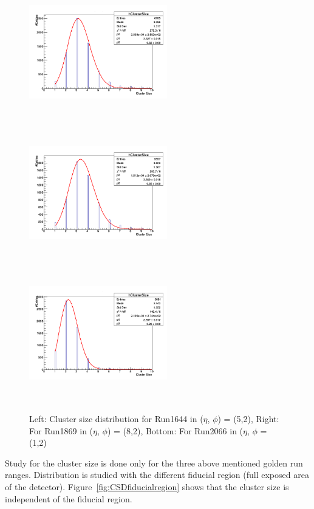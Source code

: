   \begin{figure}[!htbp]
    \begin{center}
      \includegraphics[width=6cm,height=6cm]{figures/GEM/Run1644.png}
      \includegraphics[width=6cm,height=6cm]{figures/GEM/Run1869.png}
      \includegraphics[width=6cm,height=6cm]{figures/GEM/Run2066.png}
    \end{center}
    \caption{Left: Cluster size distribution for Run1644 in ($\eta$, $\phi$) = (5,2), Right: For Run1869 in ($\eta$, $\phi$) = (8,2), Bottom: For Run2066 in ($\eta$, $\phi$ = (1,2)}
    \label{fig:CSDpoissonfunction}
  \end{figure}
Study for the cluster size is done only for the three above mentioned golden run ranges. Distribution is studied with the different fiducial region (full exposed area of the detector). Figure~\ref{fig:CSDfiducialregion} shows that the cluster size is independent of the fiducial region.
